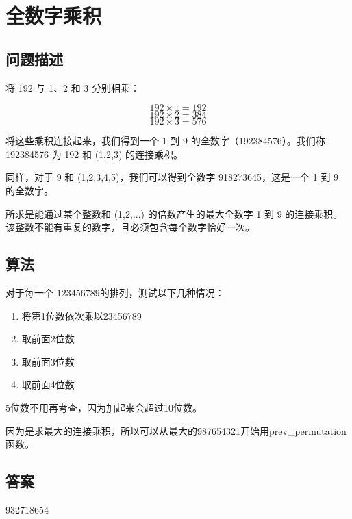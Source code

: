 \section{全数字乘积}
\subsection{问题描述}
\begin{tcolorbox}

将 192 与 1、2 和 3 分别相乘：

\[
192 \times 1 = 192
\]
\[
192 \times 2 = 384
\]
\[
192 \times 3 = 576
\]

将这些乘积连接起来，我们得到一个 1 到 9 的全数字（192384576）。我们称 192384576 为 192 和 (1,2,3) 的连接乘积。

同样，对于 9 和 (1,2,3,4,5)，我们可以得到全数字 918273645，这是一个 1 到 9 的全数字。

所求是能通过某个整数和 (1,2,...) 的倍数产生的最大全数字 1 到 9 的连接乘积。该整数不能有重复的数字，且必须包含每个数字恰好一次。
\end{tcolorbox}

\subsection{算法}
对于每一个 \( 123456789 \)的排列，测试以下几种情况：
\begin{enumerate}
	\item 将第1位数依次乘以23456789
	\item 取前面2位数
	\item 取前面3位数
	\item 取前面4位数
\end{enumerate}
5位数不用再考查，因为加起来会超过10位数。

因为是求最大的连接乘积，所以可以从最大的987654321开始用prev\_permutation函数。

\subsection{答案}
932718654
